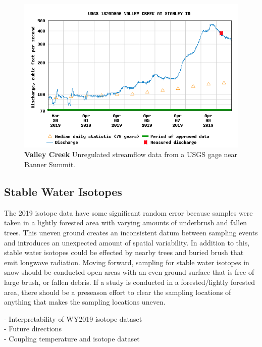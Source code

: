 \begin{figure}
    \centering
    \includegraphics[width=0.8\linewidth]{figures/ValleyCreek_Gage.png}
    \caption{\textbf{Valley Creek} Unregulated streamflow data from a USGS gage near Banner Summit.}
    \label{fig:ValleyCreek}
 \end{figure}

\subsection{Stable Water Isotopes}
The 2019 isotope data have some significant random error because samples were taken in a lightly forested area with varying amounts of underbrush and fallen trees. This uneven ground creates an inconsistent datum between sampling events and introduces an unexpected amount of spatial variability. In addition to this, stable water isotopes could be effected by nearby trees and buried brush that emit longwave radiation. Moving forward, sampling for stable water isotopes in snow should be conducted open areas with an even ground surface that is free of large brush, or fallen debris. If a study is conducted in a forested/lightly forested area, there should be a preseason effort to clear the sampling locations of anything that makes the sampling locations uneven. 

- Interpretability of WY2019 isotope dataset \\
- Future directions  \\
- Coupling temperature and isotope dataset \\
